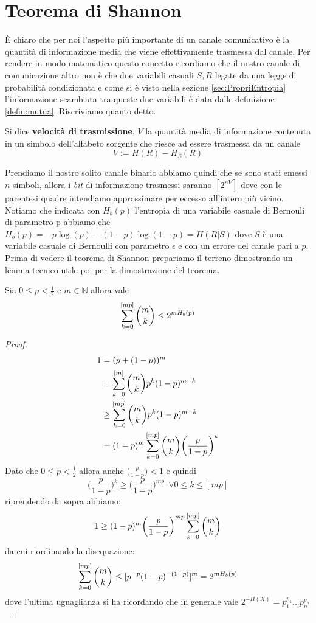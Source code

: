 \section{Teorema di Shannon}
È chiaro che per noi l'aspetto più importante di un canale comunicativo è la quantità di informazione media che viene effettivamente trasmessa dal canale. Per rendere in modo matematico questo concetto ricordiamo che il nostro canale di comunicazione altro non è che due variabili casuali $S,R$ legate da una legge di probabilità condizionata e come si è visto nella sezione \ref{sec:PropriEntropia} l'informazione scambiata tra queste due variabili è data dalle definizione \ref{defin:mutua}. Riscriviamo quanto detto.
\begin{defi}
Si dice \textbf{velocità di trasmissione}, $V$ la quantità media di informazione contenuta in un simbolo dell'alfabeto sorgente che riesce ad essere trasmessa da un canale
$$V:=H(R)-H_S(R)$$
\end{defi}
Prendiamo il nostro solito canale binario abbiamo quindi che se sono stati emessi $n$ simboli, allora i \textit{bit} di informazione trasmessi saranno $[2^{nV}]$ dove con le parentesi quadre intendiamo approssimare per eccesso all'intero più vicino.\\
Notiamo che indicata con $H_b(p)$ l'entropia di una variabile casuale di Bernouli di parametro p abbiamo che $H_b(p)=-p \log(p)- (1-p) \log(1-p) =H(R|S)$ dove $S$ è una variabile casuale di Bernoulli con parametro $\epsilon$ e con un errore del canale pari a $p$.\\
Prima di vedere il teorema di Shannon prepariamo il terreno dimostrando un lemma tecnico utile poi per la dimostrazione del teorema.
\begin{lem}
Sia $0 \leq p < \frac{1}{2}$ e $m\in \mathbb{N}$ allora vale
\begin{equation} \label{eq:7.6}
\sum_{k=0}^{[mp]} {m \choose k} \leq 2^{mH_b(p)}
\end{equation}
\end{lem}
\begin{proof}

 \[
\begin{split}
1&=(p+(1-p))^m \\
& = \sum_{k=0}^{[m]}  {m \choose k} p^k (1-p)^{m-k}\\
& \geq   \sum_{k=0}^{[mp]} {m \choose k} p^k (1-p)^{m-k} \\
&=(1-p)^m \sum_{k=0}^{[mp]} {m \choose k} \bigg( \frac{p}{1-p} \bigg)^k
\end{split}
\]
Dato che $0 \leq p < \frac{1}{2}$ allora anche $\bigg( \frac{p}{1-p} \bigg)<1$ e quindi
$$\bigg( \frac{p}{1-p} \bigg)^k \geq \bigg( \frac{p}{1-p} \bigg)^{mp} \ \ \forall 0\leq k \leq [mp]$$
riprendendo da sopra abbiamo:
$$1 \geq (1-p)^m  \bigg( \frac{p}{1-p} \bigg)^{mp} \sum_{k=0}^{[mp]} {m \choose k}$$
da cui riordinando la disequazione:
$$\sum_{k=0}^{[mp]} {m \choose k} \leq [p^{-p}(1-p)^{-(1-p)}]^m= 2^{mH_b(p)}$$
dove l'ultima uguaglianza si ha ricordando che in generale vale $2^{-H(X)}=p_1^{p_1}...p_n^{p_n}$
\end{proof}
